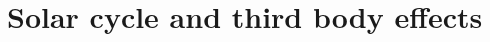 \documentclass[12pt,reqno]{amsart}
\numberwithin{equation}{section}
\newcommand{\red}{\textcolor{red}}
\begin{document}
\section{Solar cycle and third body effects}\label{sec:results}





\end{document}
